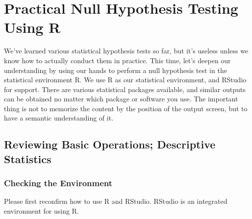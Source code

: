 \documentclass{ltjsbook}
\begin{document}
\chapter{Practical Null Hypothesis Testing Using R}
\label{chapter20}


\label{chapter20}
We've learned various statistical hypothesis tests so far, but it's useless unless we know how to actually conduct them in practice. This time, let's deepen our understanding by using our hands to perform a null hypothesis test in the statistical environment R. We use R as our statistical environment, and RStudio for support.
There are various statistical packages available, and similar outputs can be obtained no matter which package or software you use. The important thing is not to memorize the content by the position of the output screen, but to have a semantic understanding of it.

\section{Reviewing Basic Operations; Descriptive Statistics}
\subsection{Checking the Environment}
Please first reconfirm how to use R and RStudio. RStudio is an integrated environment for using R.
\end{document}
